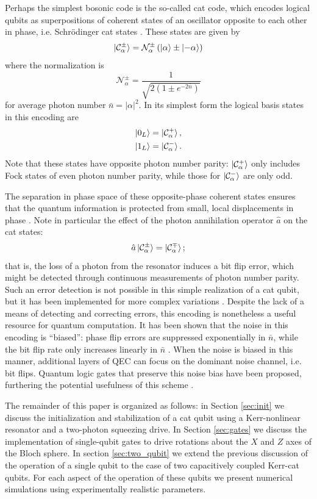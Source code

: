 Perhaps the simplest bosonic code is the so-called cat code, which encodes logical qubits as superpositions of coherent states of an oscillator opposite to each other in phase, i.e. Schr\"odinger cat states \cite{cai_2021,mirrahimi_2014,puri_2017,ofek_2016,grimm_2020,ma_2021}.
These states are given by
\[
    \ket{\mathcal{C}_\alpha^\pm} = \mathcal{N}_\alpha^\pm \left ( \ket{\alpha} \pm \ket{-\alpha} \right )
\]
where the normalization is
\[
    \mathcal{N}_\alpha^\pm = \frac {1} {\sqrt{ 2 \left ( 1 \pm e^{-2\bar{n}} \right ) }}
\]
for average photon number $\bar{n} = |\alpha|^2$.
In its simplest form the logical basis states in this encoding are
\begin{align*}
    \ket{0_L} &= \ket{\mathcal{C}_\alpha^+}, \\
    \ket{1_L} &= \ket{\mathcal{C}_\alpha^-}.
\end{align*}
Note that these states have opposite photon number parity: $\ket{\mathcal{C}_\alpha^+}$ only includes Fock states of even photon number parity, while those for $\ket{\mathcal{C}_\alpha^-}$ are only odd.

The separation in phase space of these opposite-phase coherent states ensures that the quantum information is protected from small, local displacements in phase \cite{mirrahimi_2014,grimm_2020}.
Note in particular the effect of the photon annihilation operator $\hat{a}$ on the cat states:
\[
    \hat{a} \ket{\mathcal{C}_\alpha^\pm} = \ket{\mathcal{C}_\alpha^\mp};
\]
that is, the loss of a photon from the resonator induces a bit flip error, which might be detected through continuous measurements of photon number parity.
Such an error detection is not possible in this simple realization of a cat qubit, but it has been implemented for more complex variations \cite{ofek_2016}.
Despite the lack of a means of detecting and correcting errors, this encoding is nonetheless a useful resource for quantum computation.
It has been shown that the noise in this encoding is ``biased'': phase flip errors are suppressed exponentially in $\bar{n}$, while the bit flip rate only increases linearly in $\bar{n}$ \cite{puri_2017,puri_2019}.
When the noise is biased in this manner, additional layers of QEC can focus on the dominant noise channel, i.e. bit flips.
Quantum logic gates that preserve this noise bias have been proposed, furthering the potential usefulness of this scheme \cite{puri_2020}.

The remainder of this paper is organized as follows: in Section \ref{sec:init} we discuss the initialization and stabilization of a cat qubit using a Kerr-nonlinear resonator and a two-photon squeezing drive.
In Section \ref{sec:gates} we discuss the implementation of single-qubit gates to drive rotations about the $X$ and $Z$ axes of the Bloch sphere.
In section \ref{sec:two_qubit} we extend the previous discussion of the operation of a single qubit to the case of two capacitively coupled Kerr-cat qubits.
For each aspect of the operation of these qubits we present numerical simulations using experimentally realistic parameters.
